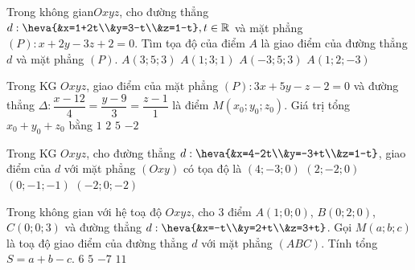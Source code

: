 \begin{ex}%
Trong không gian$ Oxyz$, cho đường thẳng $d:\heva{&x=1+2t\\&y=3-t\\&z=1-t}, t\in\mathbb{R}$ và mặt phẳng $(P):x+2y-3z+2=0$. Tìm tọa độ của điểm $A$ là giao điểm của đường thẳng $d$ và mặt phẳng $(P)$.
\choice
{$A(3;5;3)$}
{$A(1;3;1)$}
{\True $A(-3;5;3)$}
{$A(1;2;-3)$}
\end{ex}

\begin{ex}%
Trong KG $Oxyz$, giao điểm của mặt phẳng $(P):3x+5y-z-2=0$ và đường thẳng $\Delta:\dfrac{x-12}{4}=\dfrac{y-9}{3}=\dfrac{z-1}{1}$ là điểm $M\left(x_0;y_0;z_0\right)$. Giá trị tổng $x_0+y_0+z_0$ bằng
\choice
{$1$}
{$2$}
{$5$}
{\True $-2$}
\end{ex}

\begin{ex}%
Trong KG $Oxyz$, cho đường thẳng $d:\heva{&x=4-2t\\&y=-3+t\\&z=1-t}$, giao điểm của $d$ với mặt phẳng $(Oxy)$ có tọa độ là
\choice
{$(4;-3;0)$}
{\True $(2;-2;0)$}
{$(0;-1;-1)$}
{$(-2;0;-2)$}
\end{ex}

\begin{ex}%
Trong không gian với hệ toạ độ $Oxyz$, cho $3$ điểm $A(1;0;0)$, $B(0;2;0)$, $C(0;0;3)$ và đường thẳng $d:\heva{&x=-t\\&y=2+t\\&z=3+t}$. Gọi $M(a;b;c)$ là toạ độ giao điểm của đường thẳng $d$ với mặt phẳng $(ABC)$. Tính tổng $S=a+b-c$.
\choice
{$6$}
{$5$}
{\True $-7$}
{$11$}
\end{ex}

